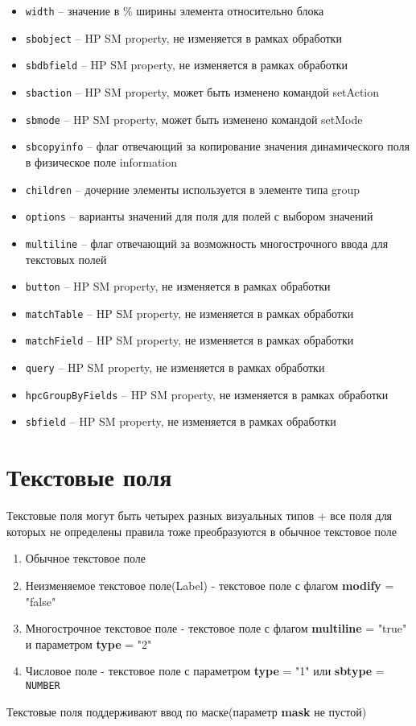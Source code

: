 \documentclass[../index.tex]{subfiles}
\begin{document}
\begin{itemize}
    \item \verb|width| -- значение в \% ширины элемента относительно блока
    \item \verb|sbobject| -- HP SM property, не изменяется в рамках обработки
    \item \verb|sbdbfield| -- HP SM property, не изменяется в рамках обработки
    \item \verb|sbaction| -- HP SM property, может быть изменено командой setAction
    \item \verb|sbmode| -- HP SM property, может быть изменено командой setMode
    \item \verb|sbcopyinfo| -- флаг отвечающий за копирование значения динамического поля в физическое поле information
    \item \verb|children| -- дочерние элементы используется в элементе типа group
    \item \verb|options| -- варианты значений для поля для полей с выбором значений
    \item \verb|multiline| -- флаг отвечающий за возможность многострочного ввода для текстовых полей
    \item \verb|button| -- HP SM property, не изменяется в рамках обработки
    \item \verb|matchTable| -- HP SM property, не изменяется в рамках обработки
    \item \verb|matchField| -- HP SM property, не изменяется в рамках обработки
    \item \verb|query| -- HP SM property, не изменяется в рамках обработки
    \item \verb|hpcGroupByFields| -- HP SM property, не изменяется в рамках обработки
    \item \verb|sbfield| -- HP SM property, не изменяется в рамках обработки
\end{itemize}

\section{Текстовые поля}
    Текстовые поля могут быть четырех разных визуальных типов + все поля для которых не определены правила тоже преобразуются в обычное текстовое поле
    \begin{enumerate}
        \item Обычное текстовое поле
        \item Неизменяемое текстовое поле(Label) - текстовое поле с флагом \textbf{modify} = "false"
        \item Многострочное текстовое поле - текстовое поле с флагом \textbf{multiline} = "true" и параметром \textbf{type} = "2"
        \item Числовое поле - текстовое поле с параметром \textbf{type} = "1" или \textbf{sbtype} = \verb|NUMBER|
    \end{enumerate}
    Текстовые поля поддерживают ввод по маске(параметр \textbf{mask} не пустой)
\end{document}
